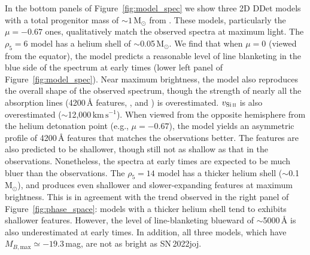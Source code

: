 \documentclass[twocolumn]{aastex631}
\newcommand{\sn}{SN\,2022joj}
\newcommand{\kms}{$\mathrm{km}\,\mathrm{s}^{-1}$}
\begin{document}
\begin{CJK*}{UTF8}{gbsn}

In the bottom panels of Figure~\ref{fig:model_spec} we show three 2D DDet models with a total progenitor mass of $\sim$$1\,\mathrm{M_\odot}$ from \citet{Shen_2D_2021}. These models, particularly the $\mu = -0.67$ ones, qualitatively match the observed spectra at maximum light. The $\rho_5=6$ model has a helium shell of $\sim$0.05$\,\mathrm{M_\odot}$. We find that when $\mu=0$ (viewed from the equator), the model predicts a reasonable level of line blanketing in the blue side of the spectrum at early times (lower left panel of Figure~\ref{fig:model_spec}). Near maximum brightness, the model also reproduces the overall shape of the observed spectrum, though the strength of nearly all the absorption lines (4200\,\r{A} features, , and ) is overestimated. $v_\mathrm{Si\,\textsc{ii}}$ is also overestimated ($\sim$12,000\,\kms). When viewed from the opposite hemisphere from the helium detonation point (e.g., $\mu=-0.67$), the model yields an asymmetric profile of 4200\,\r{A} features that matches the observations better. The  features are also predicted to be shallower, though still not as shallow as that in the observations. Nonetheless, the spectra at early times are expected to be much bluer than the observations. The $\rho_5=14$ model has a thicker helium shell ($\sim$0.1\,$\mathrm{M_\odot}$), and produces even shallower and slower-expanding  features at maximum brightness. This is in agreement with the trend observed in the right panel of Figure~\ref{fig:phase_space}: models with a thicker helium shell tend to exhibits shallower  features. However, the level of line-blanketing blueward of $\sim$5000\,\r{A} is also underestimated at early times. In addition, all three models, which have $M_{B,\mathrm{max}}\simeq -19.3$\,mag, are not as bright as \sn. 


\end{CJK*}
\end{document}
